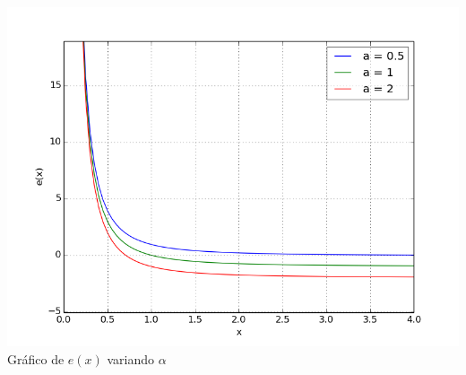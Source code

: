 \begin{center}
\includegraphics[scale=0.5]{graficos/e(x).png}\\
Gráfico de $e(x)$ variando $\alpha$
\end{center}
